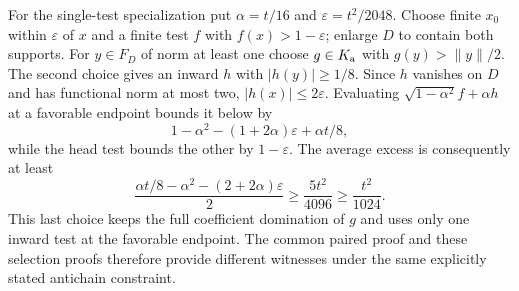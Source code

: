 For the single-test specialization put $\alpha=t/16$ and
$\varepsilon=t^2/2048$. Choose finite $x_0$ within $\varepsilon$
of $x$ and a finite test $f$ with $f(x)>1-\varepsilon$; enlarge $D$
to contain both supports. For $y\in F_D$ of norm at least one choose
$g\in K_{\rm a}$ with $g(y)>\|y\|/2$. The second choice gives an
inward $h$ with $|h(y)|\ge1/8$. Since $h$ vanishes on $D$ and has
functional norm at most two, $|h(x)|\le2\varepsilon$. Evaluating
$\sqrt{1-\alpha^2}f+\alpha h$ at a favorable endpoint bounds it below by
\[
 1-\alpha^2-(1+2\alpha)\varepsilon+\alpha t/8,
\]
while the head test bounds the other by $1-\varepsilon$.
The average excess is consequently at least
\[
 \frac{\alpha t/8-\alpha^2-(2+2\alpha)\varepsilon}{2}
 \ge\frac{5t^2}{4096}\ge\frac{t^2}{1024}.
\]
This last choice keeps the full coefficient domination of $g$ and
uses only one inward test at the favorable endpoint. The common
paired proof and these selection proofs therefore provide different
witnesses under the same explicitly stated antichain constraint.
